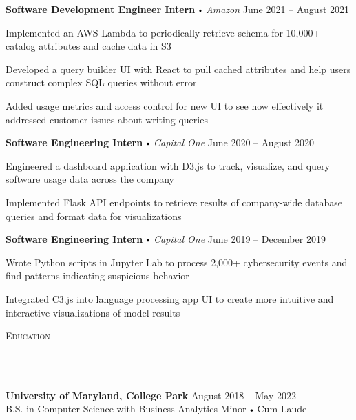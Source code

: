 \documentclass{article}
\newcommand{\header}[1]{{
\hspace*{-15pt}\vspace*{10pt} \large \scshape{#1}} \vspace*{-6pt} 
\lineunder
}
\newcommand{\lineunder}{
\vspace*{-8pt} \\ \hspace*{-18pt} 
\hrulefill \\
}
\newcommand{\school}[4]{
\textbf{#1} #2 \hfill #3 \\ #4 \vspace*{5pt}
}
\newcommand{\employer}[4]{
\textbf{#1} \labelitemi \textit{#2} \hfill #3 \\ #4 \vspace*{3pt}
}
\renewcommand{\labelitemi}{
$\vcenter{\hbox{\tiny$\bullet$}}$\hspace*{3pt}
}
\renewcommand{\labelitemii}{
$\vcenter{\hbox{\tiny$\bullet$}}$\hspace*{-3pt}
}
\newenvironment{bullet-list-minor}{
\begin{list}{\labelitemii}{\setlength\leftmargin{15pt} 
\topsep 0pt \itemsep 1pt}}{\vspace*{4pt}\end{list}
}
\begin{document}
     \employer{Software Development Engineer Intern}{Amazon}{June  2021 -- August 2021}{}
	\begin{bullet-list-minor}
	\item Implemented an AWS Lambda to periodically retrieve
	schema for 10,000+ catalog attributes and cache data in S3
    \item Developed a query builder UI with React to pull cached attributes and help users construct complex SQL queries without error
    \item Added usage metrics and access control for new UI to see how effectively it addressed customer issues about writing queries
    \end{bullet-list-minor}
    \medskip
    
    \employer{Software Engineering Intern}{Capital One}{June 2020 -- August 2020}{}
	\begin{bullet-list-minor}
	\item Engineered a dashboard application with D3.js to track, visualize, and query software usage data across the company
	\item Implemented Flask API endpoints to retrieve results of company-wide database queries and format data for visualizations
    \end{bullet-list-minor}
    \medskip
    
    \employer{Software Engineering Intern}{Capital One}{June 2019 -- December 2019}{}
	\begin{bullet-list-minor}
	\item Wrote Python scripts in Jupyter Lab to process 2,000+  cybersecurity events and find patterns indicating suspicious behavior
	\item Integrated C3.js into language processing app UI to create more intuitive and interactive visualizations of model results
    \end{bullet-list-minor}
\medskip

\header{Education}
    \vspace{4pt}
    \school{University of Maryland, College Park}{}{August 2018 -- May 2022}{\vspace{4pt}  B.S. in Computer Science with Business Analytics Minor \labelitemi Cum Laude}


\medskip
\end{document}
